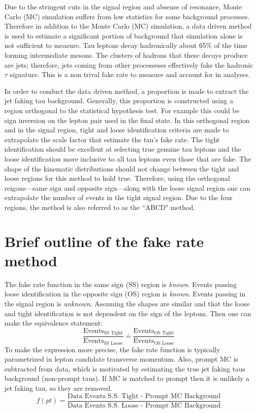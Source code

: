 
Due to the stringent cuts in the signal region and absense of resonance, Monte Carlo (MC) simulation suffers from low statistics for some background processes.  
Therefore in addition to the Monte Carlo (MC) simulation, a data driven method is used to estimate a significant portion of background that simulation alone is not sufficient to measure. 
Tau leptons decay hadronically about 65\% of the time forming intermediate mesons. 
The clusters of hadrons that these decays produce are jets; therefore, jets coming from other processeses effectively fake the hadronic $\tau$ signature. This is a non trival fake rate to measure and account for in analyses. 

In order to conduct the data driven method, a proportion is made to extract the jet faking tau background. Generally, this proportion is constructed using a region orthogonal to the statistical hypothesis test. For example this could be sign inversion on the lepton pair used in the final state. In this orthogonal region and in the signal region, tight and loose identification criteria are made to extrapolate the scale factor that estimate the tau's fake rate. 
The tight identification should be excellent at selecting true genuine tau leptons and the loose identification more inclusive to all tau leptons even those that are fake. 
The shape of the kinematic distributions should not change between the tight and loose regions for this method to hold true. 
Therefore, using the orthogonal reigons---same sign and opposite sign---along with the loose signal region one can extrapolate the number of events in the tight signal region. Due to the four regions, the method is also referred to as the ``ABCD" method. 


\section{Brief outline of the fake rate method}
The fake rate function in the same sign (SS) region is \textit{known}.
Events passing loose identification in the opposite sign (OS) region is \textit{known}.
Events passing in the signal region is \textit{unknown}. 
Assuming the shapes are similar and that the loose and tight identification is not dependent on the sign of the leptons. Then one can make the equivalence statement: 
\begin{equation}
\label{eq:abcd}
\frac{\text{Events}_\text{SS Tight}}{\text{Events}_\text{SS Loose}} \doteq \frac{\text{Events}_\text{OS Tight}}{\text{Events}_\text{OS Loose}}
\end{equation}
To make the expression more precise, the fake rate function is typically parametrized in lepton candidate transverse momentum. 
 Also, prompt MC is subtracted from data, which is motivated by estimating the true jet faking taus background (non-prompt taus). If MC is matched to prompt then it is unlikely a jet faking tau, so they are removed. 
\begin{equation}f(pt)=\frac{\text{Data Events S.S. Tight - Prompt MC Background}}{\text{Data Events S.S. Loose - Prompt MC Background}}\end{equation} 

